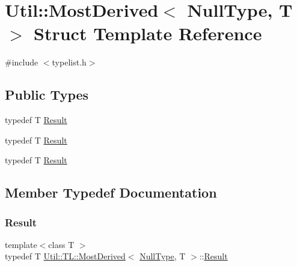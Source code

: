 \hypertarget{structUtil_1_1TL_1_1MostDerived_3_01NullType_00_01T_01_4}{}\section{Util\+:\+:Most\+Derived$<$ Null\+Type, T $>$ Struct Template Reference}
\label{structUtil_1_1TL_1_1MostDerived_3_01NullType_00_01T_01_4}


{\ttfamily \#include $<$typelist.\+h$>$}

\subsection*{Public Types}
\begin{DoxyCompactItemize}
\item 
typedef T \mbox{\hyperlink{structUtil_1_1TL_1_1MostDerived_3_01NullType_00_01T_01_4_a67aeb01e6a29f0a07798b8626b0d69c2}{Result}}
\item 
typedef T \mbox{\hyperlink{structUtil_1_1TL_1_1MostDerived_3_01NullType_00_01T_01_4_a67aeb01e6a29f0a07798b8626b0d69c2}{Result}}
\item 
typedef T \mbox{\hyperlink{structUtil_1_1TL_1_1MostDerived_3_01NullType_00_01T_01_4_a67aeb01e6a29f0a07798b8626b0d69c2}{Result}}
\end{DoxyCompactItemize}


\subsection{Member Typedef Documentation}
\mbox{\label{structUtil_1_1TL_1_1MostDerived_3_01NullType_00_01T_01_4_a67aeb01e6a29f0a07798b8626b0d69c2}} 
\subsubsection{\texorpdfstring{Result}{Result}\hspace{0.1cm}{\footnotesize\ttfamily [1/3]}}
{\footnotesize\ttfamily template$<$class T $>$ \\
typedef T \mbox{\hyperlink{structUtil_1_1TL_1_1MostDerived}{Util\+::\+T\+L\+::\+Most\+Derived}}$<$ \mbox{\hyperlink{classUtil_1_1NullType}{Null\+Type}}, T $>$\+::\mbox{\hyperlink{structUtil_1_1TL_1_1MostDerived_3_01NullType_00_01T_01_4_a67aeb01e6a29f0a07798b8626b0d69c2}{Result}}}

